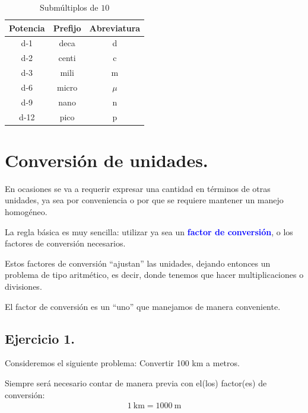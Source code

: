 \documentclass[14pt]{extarticle}
\newcommand{\textocolor}[2]{\textbf{\textcolor{#1}{#2}}}
\begin{document}
\begin{table}[H]
\renewcommand{\arraystretch}{1}
\centering
\begin{tabular}{c | c | c}
Potencia & Prefijo & Abreviatura \\ \hline
\num{d-1} & deca & d \\ \hline
\num{d-2} & centi & c \\ \hline
\num{d-3} & mili & m \\ \hline
\num{d-6} & micro & $\mu$ \\ \hline
\num{d-9} & nano & n \\ \hline
\num{d-12} & pico & p \\ \hline
\end{tabular}
\caption{Submúltiplos de $10$}
\end{table}


\section{Conversión de unidades.}

En ocasiones se va a requerir expresar una cantidad en términos de otras unidades, ya sea por conveniencia o por que se requiere mantener un manejo homogéneo.

La regla básica es muy sencilla:  utilizar ya sea un \textocolor{blue}{factor de conversión}, o los factores de conversión necesarios.

Estos factores de conversión \enquote{ajustan} las unidades, dejando entonces un problema de tipo aritmético,  es decir, donde tenemos que hacer multiplicaciones o divisiones.

El factor de conversión es un \enquote{uno} que manejamos de manera conveniente.


\subsection{Ejercicio 1.}

Consideremos el siguiente problema: Convertir 100 km a metros.
\par
Siempre será necesario contar de manera previa con el(los) factor(es) de conversión:
\begin{align*}
\SI{1}{\kilo\meter} = \SI{1000}{\meter}
\end{align*}
\end{document}
